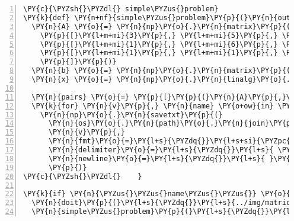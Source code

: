 \begin{Verbatim}[commandchars=\\\{\},numbers=left,numbersep=0.5em]
\PY{c}{\PYZsh{}\PYZdl{} simple\PYZus{}problem}
\PY{k}{def} \PY{n+nf}{simple\PYZus{}problem}\PY{p}{(}\PY{n}{outdir}\PY{p}{)}\PY{p}{:}
  \PY{n}{A} \PY{o}{=} \PY{n}{np}\PY{o}{.}\PY{n}{matrix}\PY{p}{(}\PY{p}{[}
    \PY{p}{[}\PY{l+m+mi}{3}\PY{p}{,} \PY{l+m+mi}{5}\PY{p}{,} \PY{l+m+mi}{2}\PY{p}{]}\PY{p}{,}
    \PY{p}{[}\PY{l+m+mi}{1}\PY{p}{,} \PY{l+m+mi}{6}\PY{p}{,} \PY{l+m+mi}{2}\PY{p}{]}\PY{p}{,}
    \PY{p}{[}\PY{l+m+mi}{1}\PY{p}{,} \PY{l+m+mi}{1}\PY{p}{,} \PY{l+m+mi}{1}\PY{p}{]}\PY{p}{,}
    \PY{p}{]}\PY{p}{)}
  \PY{n}{b} \PY{o}{=} \PY{n}{np}\PY{o}{.}\PY{n}{matrix}\PY{p}{(}\PY{p}{[}\PY{l+m+mi}{1}\PY{p}{,}\PY{l+m+mi}{2}\PY{p}{,}\PY{l+m+mi}{3}\PY{p}{]}\PY{p}{)}\PY{o}{.}\PY{n}{T}
  \PY{n}{x} \PY{o}{=} \PY{n}{np}\PY{o}{.}\PY{n}{linalg}\PY{o}{.}\PY{n}{solve}\PY{p}{(}\PY{n}{A}\PY{p}{,} \PY{n}{b}\PY{p}{)}
  
  \PY{n}{pairs} \PY{o}{=} \PY{p}{[}\PY{p}{(}\PY{n}{A}\PY{p}{,}\PY{l+s}{\PYZdq{}}\PY{l+s}{A}\PY{l+s}{\PYZdq{}}\PY{p}{)}\PY{p}{,} \PY{p}{(}\PY{n}{b}\PY{p}{,}\PY{l+s}{\PYZdq{}}\PY{l+s}{b}\PY{l+s}{\PYZdq{}}\PY{p}{)}\PY{p}{,} \PY{p}{(}\PY{n}{x}\PY{p}{,}\PY{l+s}{\PYZdq{}}\PY{l+s}{x}\PY{l+s}{\PYZdq{}}\PY{p}{)}\PY{p}{]}
  \PY{k}{for} \PY{n}{v}\PY{p}{,} \PY{n}{name} \PY{o+ow}{in} \PY{n}{pairs}\PY{p}{:}
    \PY{n}{np}\PY{o}{.}\PY{n}{savetxt}\PY{p}{(}
      \PY{n}{os}\PY{o}{.}\PY{n}{path}\PY{o}{.}\PY{n}{join}\PY{p}{(}\PY{n}{outdir}\PY{p}{,} \PY{l+s}{\PYZdq{}}\PY{l+s}{\PYZob{}\PYZcb{}.tex}\PY{l+s}{\PYZdq{}}\PY{o}{.}\PY{n}{format}\PY{p}{(}\PY{n}{name}\PY{p}{)}\PY{p}{)}\PY{p}{,}
      \PY{n}{v}\PY{p}{,}
      \PY{n}{fmt}\PY{o}{=}\PY{l+s}{\PYZdq{}}\PY{l+s+si}{\PYZpc{}5.3f}\PY{l+s}{\PYZdq{}}\PY{p}{,}
      \PY{n}{delimiter}\PY{o}{=}\PY{l+s}{\PYZdq{}}\PY{l+s}{ \PYZam{} }\PY{l+s}{\PYZdq{}}\PY{p}{,}     \PY{c}{\PYZsh{} These two lines }
      \PY{n}{newline}\PY{o}{=}\PY{l+s}{\PYZdq{}}\PY{l+s}{ }\PY{l+s+se}{\PYZbs{}\PYZbs{}}\PY{l+s+se}{\PYZbs{}\PYZbs{}}\PY{l+s+se}{\PYZbs{}n}\PY{l+s}{\PYZdq{}}\PY{p}{,}   \PY{c}{\PYZsh{} enable latex inputs.}
      \PY{p}{)}
\PY{c}{\PYZsh{}\PYZdl{}    }

\PY{k}{if} \PY{n}{\PYZus{}\PYZus{}name\PYZus{}\PYZus{}} \PY{o}{==} \PY{l+s}{\PYZdq{}}\PY{l+s}{\PYZus{}\PYZus{}main\PYZus{}\PYZus{}}\PY{l+s}{\PYZdq{}}\PY{p}{:}
  \PY{n}{doit}\PY{p}{(}\PY{l+s}{\PYZdq{}}\PY{l+s}{../img/matrices}\PY{l+s}{\PYZdq{}}\PY{p}{)}
  \PY{n}{simple\PYZus{}problem}\PY{p}{(}\PY{l+s}{\PYZdq{}}\PY{l+s}{../tex/pieces}\PY{l+s}{\PYZdq{}}\PY{p}{)}
\end{Verbatim}
